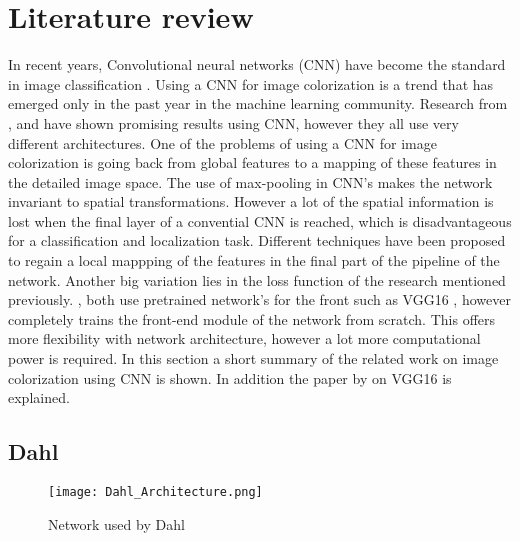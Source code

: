 \section{Literature review} \label{sec:litreview}
 
In recent years, Convolutional neural networks (CNN) have become the standard in image
classification \cite{Krizhevsky}. Using a CNN for image colorization is a trend that has emerged only in the past year in the machine learning community. Research from \cite{Dahl}, \cite{Zhang}
and \cite{Cheng} have shown promising results using CNN, however they all use very different
architectures. One of the problems of using a CNN for image colorization is going back from global features to a mapping of these features in the detailed image space. The use of max-pooling in CNN's makes the network invariant to spatial transformations. However a lot of the spatial information is lost when the final layer of a convential CNN is reached, which is disadvantageous for a classification and localization task. Different techniques have been proposed to regain a local mappping of the features in the final part of the pipeline of the network. Another big variation lies in the loss function of the research mentioned previously. \cite{Dahl}, \cite{Zhang} both use pretrained network's for the front such as VGG16 \cite{Simonyan}, however \cite{Cheng} completely trains the front-end module of the network from scratch. This offers more flexibility with network architecture, however a lot more computational power is required. In
this section a short summary of the related work on image colorization using CNN is shown. In addition the paper by \cite{Simonyan} on VGG16 is explained.

\subsection{Dahl}

\begin{wrapfigure}{r}{0.50\textwidth}
	\vspace{5pt}
	\begin{center}
		\texttt{[image: Dahl\_Architecture.png]}
	\end{center}
	\caption{Network used by Dahl \cite{Dahl}}
	\label{fig:dahlnetwork}
	\vspace{5pt}
\end{wrapfigure}


